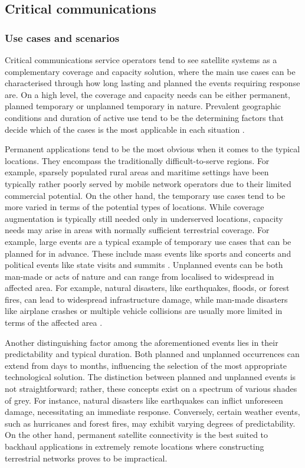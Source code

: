 \documentclass[english, 12pt, a4paper, elec, utf8, a-1b, online]{aaltothesis}
\begin{document}
\subsection{Critical communications}
\subsubsection{Use cases and scenarios}

Critical communications service operators tend to see satellite systems as a complementary coverage and capacity solution, where the main use cases can be characterised through how long lasting and planned the events requiring response are.
On a high level, the coverage and capacity needs can be either permanent, planned temporary or unplanned temporary in nature.
Prevalent geographic conditions and duration of active use tend to be the determining factors that decide which of the cases is the most applicable in each situation \cite{saynevirta2021satellite}.

Permanent applications tend to be the most obvious when it comes to the typical locations. They encompass the traditionally difficult-to-serve regions.
For example, sparsely populated rural areas and maritime settings have been typically rather poorly served by mobile network operators due to their limited commercial potential.
On the other hand, the temporary use cases tend to be more varied in terms of the potential types of locations. While coverage augmentation is typically still needed only in underserved locations, capacity needs may arise in areas with normally sufficient terrestrial coverage.
For example, large events are a typical example of temporary use cases that can be planned for in advance. These include mass events like sports and concerts and political events like state visits and summits \cite{erve2018trump, tcca2021airbus, airbus2023bahrain}.
Unplanned events can be both man-made or acts of nature and can range from localised to widespread in affected area.
For example, natural disasters, like earthquakes, floods, or forest fires, can lead to widespread infrastructure damage, while man-made disasters like airplane crashes or multiple vehicle collisions are usually more limited in terms of the affected area \cite{firstnet2021wildfire, firstnet2021nashville}.

Another distinguishing factor among the aforementioned events lies in their predictability and typical duration.
Both planned and unplanned occurrences can extend from days to months, influencing the selection of the most appropriate technological solution.
The distinction between planned and unplanned events is not straightforward; rather, these concepts exist on a spectrum of various shades of grey.
For instance, natural disasters like earthquakes can inflict unforeseen damage, necessitating an immediate response.
Conversely, certain weather events, such as hurricanes and forest fires, may exhibit varying degrees of predictability.
On the other hand, permanent satellite connectivity is the best suited to backhaul applications in extremely remote locations where constructing terrestrial networks proves to be impractical.
\end{document}
